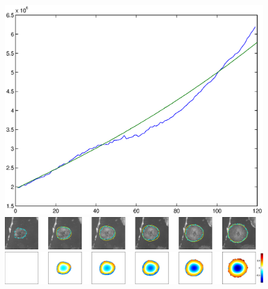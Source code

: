 \documentclass[12pt]{article}
\begin{document}
\begin{figure}[h!]
\centering
	\includegraphics[width=.5\textwidth]{mass_Pos5_exp2_withprolif_onlyinorigloc.eps} \\
	\includegraphics[width=\textwidth]{bdy_Pos5_exp2_withprolif_onlyinorigloc.eps} \\[.5em]
	\includegraphics[width=\textwidth]{dens_Pos5_exp2_withprolif_onlyinorigloc.eps}
\end{figure}
\end{document}
